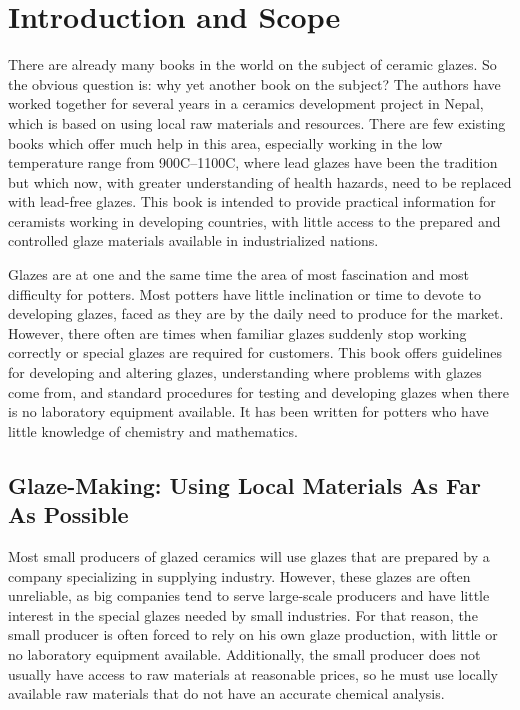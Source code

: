 \chapter{Introduction and Scope}
There are already many books in the world on the subject of ceramic glazes. So 
the obvious question is: why yet another book on the subject? The authors have 
worked together for several years in a ceramics development project in Nepal, 
which is based on using local raw materials and resources. There are few 
existing books which offer much help in this area, especially working in the 
low temperature range from 900\degree C--1100\degree C, where lead glazes 
have been the tradition but which now, with greater understanding of health 
hazards, need to be replaced with lead-free glazes. This book is intended to 
provide practical information for ceramists working in developing countries, 
with little access to the prepared and controlled glaze materials available in 
industrialized nations.

Glazes are at one and the same time the area of most fascination and most 
difficulty for potters. Most potters have little inclination or time to devote 
to developing glazes, faced as they are by the daily need to produce for the 
market. However, there often are times when familiar glazes suddenly stop 
working correctly or special glazes are required for customers. This book 
offers guidelines for developing and altering glazes, understanding where 
problems with glazes come from, and standard procedures for testing and 
developing glazes when there is no laboratory equipment available. It has been 
written for potters who have little knowledge of chemistry and mathematics.
\section{Glaze-Making: Using Local Materials As Far As Possible}
Most small producers of glazed ceramics will use glazes that are prepared by a 
company specializing in supplying industry. However, these glazes are often 
unreliable, as big companies tend to serve large-scale producers and have 
little interest in the special glazes needed by small industries. For that 
reason, the small producer is often forced to rely on his own glaze production, 
with little or no laboratory equipment available. Additionally, the small 
producer does not usually have access to raw materials at reasonable prices, so 
he must use locally available raw materials that do not have an accurate 
chemical analysis.
